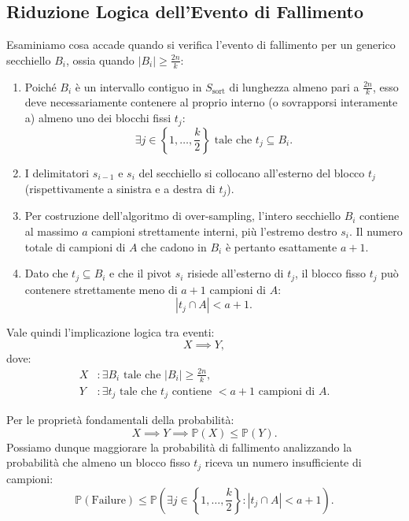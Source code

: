 \FloatBarrier
\subsection{Riduzione Logica dell'Evento di Fallimento}
Esaminiamo cosa accade quando si verifica l'evento di fallimento per un generico secchiello $B_i$, ossia quando $|B_i| \ge \frac{2n}{k}$:
\begin{enumerate}
  \item Poiché $B_i$ è un intervallo contiguo in $S_{\text{sort}}$ di lunghezza almeno pari a $\frac{2n}{k}$, esso deve necessariamente contenere al proprio interno (o sovrapporsi interamente a) almeno uno dei blocchi fissi $t_j$:
  \begin{equation}
    \exists j \in \left\{1, \dots, \frac{k}{2}\right\} \text{ tale che } t_j \subseteq B_i.
  \end{equation}
  \item I delimitatori $s_{i-1}$ e $s_i$ del secchiello si collocano all'esterno del blocco $t_j$ (rispettivamente a sinistra e a destra di $t_j$).
  \item Per costruzione dell'algoritmo di over-sampling, l'intero secchiello $B_i$ contiene al massimo $a$ campioni strettamente interni, più l'estremo destro $s_i$. Il numero totale di campioni di $A$ che cadono in $B_i$ è pertanto esattamente $a + 1$.
  \item Dato che $t_j \subseteq B_i$ e che il pivot $s_i$ risiede all'esterno di $t_j$, il blocco fisso $t_j$ può contenere strettamente meno di $a + 1$ campioni di $A$:
  \begin{equation}
    |t_j \cap A| < a + 1.
  \end{equation}
\end{enumerate}

Vale quindi l'implicazione logica tra eventi:
\begin{equation}
  X \implies Y,
\end{equation}
dove:
\begin{align}
  X &\colon \exists B_i \text{ tale che } |B_i| \ge \frac{2n}{k}, \\
  Y &\colon \exists t_j \text{ tale che } t_j \text{ contiene } < a + 1 \text{ campioni di } A.
\end{align}

Per le proprietà fondamentali della probabilità:
\begin{equation}
  X \implies Y \implies \mathbb{P}(X) \le \mathbb{P}(Y).
\end{equation}
Possiamo dunque maggiorare la probabilità di fallimento analizzando la probabilità che almeno un blocco fisso $t_j$ riceva un numero insufficiente di campioni:
\begin{equation}
  \mathbb{P}(\text{Failure}) \le \mathbb{P}\left(\exists j \in \left\{1, \dots, \frac{k}{2}\right\} \colon |t_j \cap A| < a + 1\right).
\end{equation}

